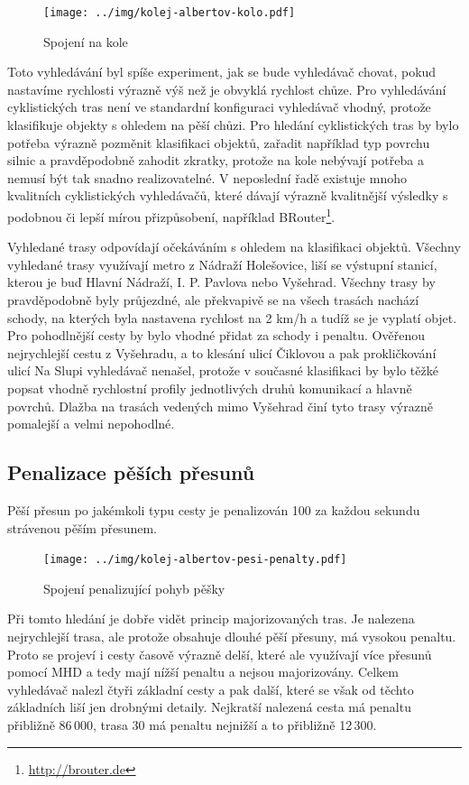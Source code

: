 \begin{figure}[h]
  \centering
    \texttt{[image: ../img/kolej-albertov-kolo.pdf]}
  \caption{Spojení na kole}
  \label{fig:kolej-albertov-kolo}
\end{figure}

Toto vyhledávání byl spíše experiment, jak se bude vyhledávač chovat, pokud
nastavíme rychlosti výrazně výš než je obvyklá rychlost chůze. Pro vyhledávání
cyklistických tras není ve standardní konfiguraci vyhledávač vhodný, protože
klasifikuje objekty s ohledem na pěší chůzi. Pro hledání cyklistických tras by
bylo potřeba výrazně pozměnit klasifikaci objektů, zařadit například typ povrchu
silnic a pravděpodobně zahodit zkratky, protože na kole nebývají potřeba a
nemusí být tak snadno realizovatelné. V neposlední řadě existuje mnoho
kvalitních cyklistických vyhledávačů, které dávají výrazně kvalitnější výsledky
s podobnou či lepší mírou přizpůsobení, například
BRouter\footnote{\url{http://brouter.de}}.

Vyhledané trasy odpovídají očekáváním s ohledem na klasifikaci objektů. Všechny
vyhledané trasy využívají metro z Nádraží Holešovice, liší se výstupní stanicí,
kterou je buď Hlavní Nádraží, I. P. Pavlova nebo Vyšehrad. Všechny trasy by
pravděpodobně byly průjezdné, ale překvapivě se na všech trasách nachází schody,
na kterých byla nastavena rychlost na 2 km/h a tudíž se je vyplatí objet. Pro
pohodlnější cesty by bylo vhodné přidat za schody i penaltu. Ověřenou
nejrychlejší cestu z Vyšehradu, a to klesání ulicí Čiklovou a pak prokličkování
ulicí Na Slupi vyhledávač nenašel, protože v současné klasifikaci by bylo těžké
popsat vhodně rychlostní profily jednotlivých druhů komunikací a hlavně povrchů.
Dlažba na trasách vedených mimo Vyšehrad činí tyto trasy výrazně pomalejší a
velmi nepohodlné.

\subsection{Penalizace pěších přesunů}
Pěší přesun po jakémkoli typu cesty je penalizován 100 za každou sekundu
strávenou pěším přesunem.

\begin{figure}[h]
  \centering
    \texttt{[image: ../img/kolej-albertov-pesi-penalty.pdf]}
  \caption{Spojení penalizující pohyb pěšky}
  \label{fig:kolej-albertov-pesi-penalty}
\end{figure}

Při tomto hledání je dobře vidět princip majorizovaných tras. Je nalezena
nejrychlejší trasa, ale protože obsahuje dlouhé pěší přesuny, má vysokou
penaltu. Proto se projeví i cesty časově výrazně delší, které ale využívají více
přesunů pomocí MHD a tedy mají nížší penaltu a nejsou majorizovány. Celkem
vyhledávač nalezl čtyři základní cesty a pak další, které se však od těchto
základních liší jen drobnými detaily. Nejkratší nalezená cesta má penaltu
přibližně 86\,000, trasa 30 má penaltu nejnižší a to přibližně 12\,300. 

